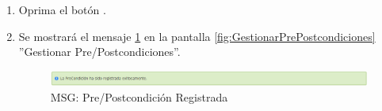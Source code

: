 \begin{enumerate}
			\item Oprima el botón \IUAceptar.
			
			\item Se mostrará el mensaje \ref{fig:prepostcondicionRegistrada} en la pantalla \ref{fig:GestionarPrePostcondiciones} ''Gestionar Pre/Postcondiciones''.
			
			\begin{figure}[htbp!]
				\begin{center}
					\includegraphics[scale=0.6]{roles/lider/casosUso/precondiciones/pantallas/IU6-1-2-1MSG1}
					\caption{MSG: Pre/Postcondición Registrada}
					\label{fig:prepostcondicionRegistrada}
				\end{center}
			\end{figure}
			\end{enumerate}